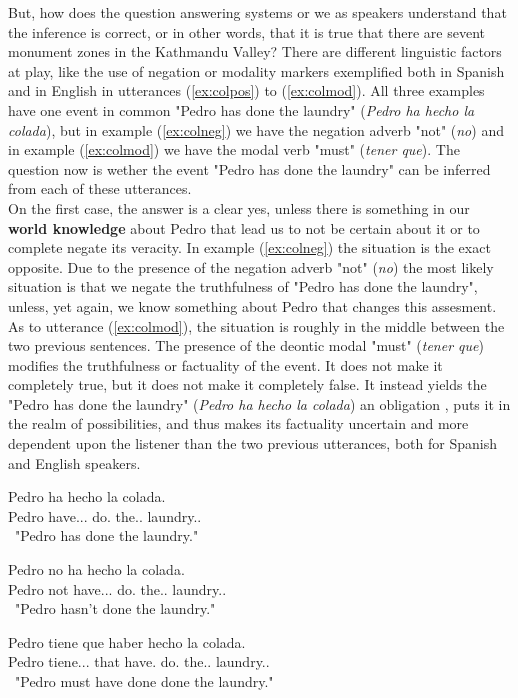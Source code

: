 But, how does the question answering systems or we as speakers understand that the inference is correct, or in other words, that it is true that there are sevent monument zones in the Kathmandu Valley? There are different linguistic factors at play, like the use of negation or modality markers exemplified both in Spanish and in English in utterances (\ref{ex:colpos}) to (\ref{ex:colmod}). All three examples have one event in common "Pedro has done the laundry" (\textit{Pedro ha hecho la colada}), but in example (\ref{ex:colneg}) we have the negation adverb "not" (\textit{no}) and in example (\ref{ex:colmod}) we have the modal verb "must" (\textit{tener que}). The question now is wether the event "Pedro has done the laundry" can be inferred from each of these utterances.\\

On the first case, the answer is a clear yes, unless there is something in our \textbf{world knowledge} about Pedro that lead us to not be certain about it or to complete negate its veracity. In example (\ref{ex:colneg}) the situation is the exact opposite. Due to the presence of the negation adverb "not" (\textit{no}) the most likely situation is that we negate the truthfulness of "Pedro has done the laundry", unless, yet again, we know something about Pedro that changes this assesment. As to utterance (\ref{ex:colmod}), the situation is roughly in the middle between the two previous sentences. The presence of the deontic modal "must" (\textit{tener que}) modifies the truthfulness or factuality of the event. It does not make it completely true, but it does not make it completely false. It instead yields the "Pedro has done the laundry" (\textit{Pedro ha hecho la colada}) an obligation \citep{morante2012modality}, puts it in the realm of possibilities, and thus makes its factuality uncertain and more dependent upon the listener than the two previous utterances, both for Spanish and English speakers.\\

\begin{exe}
  \ex
    \begin{xlist}
      \item  {\gll Pedro ha hecho la colada.\\ Pedro have.\Prs.\Ind.\Tsg{} do.\Ptcp{} the.\F.\Sg{} laundry.\M.\Sg{}\\\ "Pedro has done the laundry."\glt }\label{ex:colpos}
      \item  {\gll Pedro no ha hecho la colada.\\ Pedro not have.\Prs.\Ind.\Tsg{} do.\Ptcp{} the.\F.\Sg{} laundry.\M.\Sg{}\\\ "Pedro hasn't done the laundry."\glt }\label{ex:colneg}
      \item  {\gll Pedro tiene que haber hecho la colada.\\ Pedro tiene.\Prs.\Ind.\Tsg{} that have.\Inf{} do.\Ptcp{} the.\F.\Sg{} laundry.\M.\Sg{}\\\ "Pedro must have done done the laundry."\glt }\label{ex:colmod}
    \end{xlist}
\end{exe}

